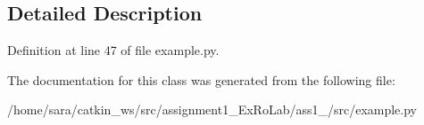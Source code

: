 \subsection{Detailed Description}


Definition at line 47 of file example.\+py.



The documentation for this class was generated from the following file\+:\begin{DoxyCompactItemize}
\item 
/home/sara/catkin\+\_\+ws/src/assignment1\+\_\+\+Ex\+Ro\+Lab/ass1\+\_/src/example.\+py\end{DoxyCompactItemize}
